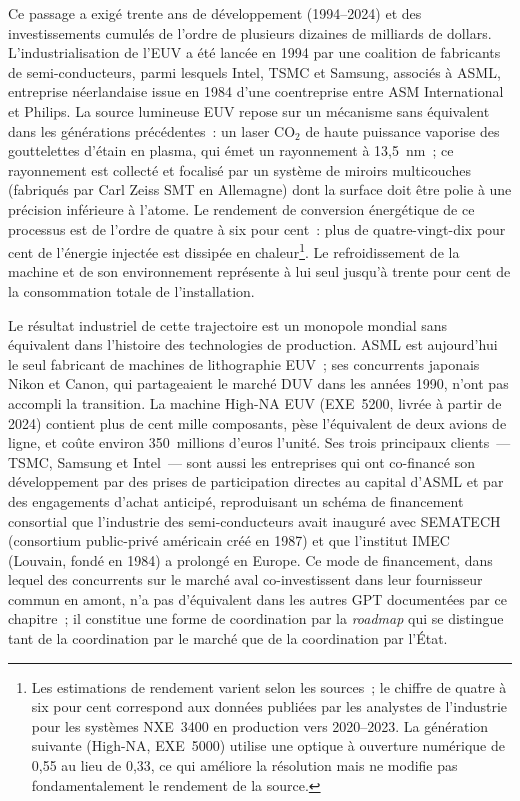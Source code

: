 %
Ce passage a exigé trente ans de développement (1994--2024) et des investissements cumulés de l'ordre de plusieurs dizaines de milliards de dollars. L'industrialisation de l'EUV a été lancée en 1994 par une coalition de fabricants de semi-conducteurs, parmi lesquels Intel, TSMC et Samsung, associés à ASML, entreprise néerlandaise issue en 1984 d'une coentreprise entre ASM International et Philips. La source lumineuse EUV repose sur un mécanisme sans équivalent dans les générations précédentes~: un laser CO$_2$ de haute puissance vaporise des gouttelettes d'étain en plasma, qui émet un rayonnement à 13,5~nm~; ce rayonnement est collecté et focalisé par un système de miroirs multicouches (fabriqués par Carl Zeiss SMT en Allemagne) dont la surface doit être polie à une précision inférieure à l'atome. Le rendement de conversion énergétique de ce processus est de l'ordre de quatre à six pour cent~: plus de quatre-vingt-dix pour cent de l'énergie injectée est dissipée en chaleur\footnote{Les estimations de rendement varient selon les sources~; le chiffre de quatre à six pour cent correspond aux données publiées par les analystes de l'industrie pour les systèmes NXE~3400 en production vers 2020--2023. La génération suivante (High-NA, EXE~5000) utilise une optique à ouverture numérique de 0,55 au lieu de 0,33, ce qui améliore la résolution mais ne modifie pas fondamentalement le rendement de la source.}. Le refroidissement de la machine et de son environnement représente à lui seul jusqu'à trente pour cent de la consommation totale de l'installation.

%
Le résultat industriel de cette trajectoire est un monopole mondial sans équivalent dans l'histoire des technologies de production. ASML est aujourd'hui le seul fabricant de machines de lithographie EUV~; ses concurrents japonais Nikon et Canon, qui partageaient le marché DUV dans les années 1990, n'ont pas accompli la transition. La machine High-NA EUV (EXE~5200, livrée à partir de 2024) contient plus de cent mille composants, pèse l'équivalent de deux avions de ligne, et coûte environ 350~millions d'euros l'unité. Ses trois principaux clients~--- TSMC, Samsung et Intel~--- sont aussi les entreprises qui ont co-financé son développement par des prises de participation directes au capital d'ASML et par des engagements d'achat anticipé, reproduisant un schéma de financement consortial que l'industrie des semi-conducteurs avait inauguré avec SEMATECH (consortium public-privé américain créé en 1987) et que l'institut IMEC (Louvain, fondé en 1984) a prolongé en Europe. Ce mode de financement, dans lequel des concurrents sur le marché aval co-investissent dans leur fournisseur commun en amont, n'a pas d'équivalent dans les autres GPT documentées par ce chapitre~; il constitue une forme de coordination par la \emph{roadmap} qui se distingue tant de la coordination par le marché que de la coordination par l'État.

